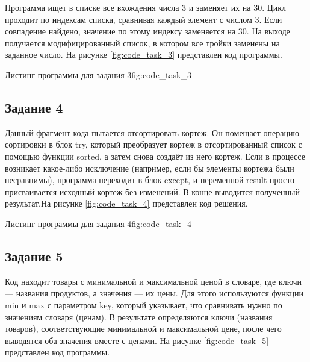 \documentclass[]{vvsu}
\begin{document}
Программа ищет в списке все вхождения числа 3 и заменяет их на 30. Цикл проходит по индексам списка, сравнивая каждый элемент с числом 3. Если совпадение найдено, значение по этому индексу заменяется на 30. На выходе получается модифицированный список, в котором все тройки заменены на заданное число. На рисунке \ref{fig:code_task_3} представлен код программы.

\begin{vvsu_figure}{Листинг программы для задания 3}{fig:code_task_3}
  \begin{minipage}{.75\textwidth}
    
  \end{minipage}
\end{vvsu_figure}

\subsection{Задание 4}

Данный фрагмент кода пытается отсортировать кортеж. Он помещает операцию сортировки в блок try, который преобразует кортеж в отсортированный список с помощью функции sorted, а затем снова создаёт из него кортеж. Если в процессе возникает какое-либо исключение (например, если бы элементы кортежа были несравнимы), программа переходит в блок except, и переменной result просто присваивается исходный кортеж без изменений. В конце выводится полученный результат.На рисунке \ref{fig:code_task_4} представлен код решения.

\begin{vvsu_figure}{Листинг программы для задания 4}{fig:code_task_4}
  \begin{minipage}{.75\textwidth}
    
  \end{minipage}
\end{vvsu_figure}


\subsection{Задание 5}

Код находит товары с минимальной и максимальной ценой в словаре, где ключи — названия продуктов, а значения — их цены. Для этого используются функции min и max с параметром key, который указывает, что сравнивать нужно по значениям словаря (ценам). В результате определяются ключи (названия товаров), соответствующие минимальной и максимальной цене, после чего выводятся оба значения вместе с ценами. На рисунке \ref{fig:code_task_5} представлен код программы.
\end{document}
